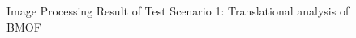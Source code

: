
\begin{figure}[H]
\hfill
{}
\begin{center}
\end{center}
\begin{center}
\end{center}
\caption{Image Processing Result of Test Scenario 1: Translational analysis of BMOF}
\label{fig:Eval_IP_TS1_2.png}
\end{figure}

